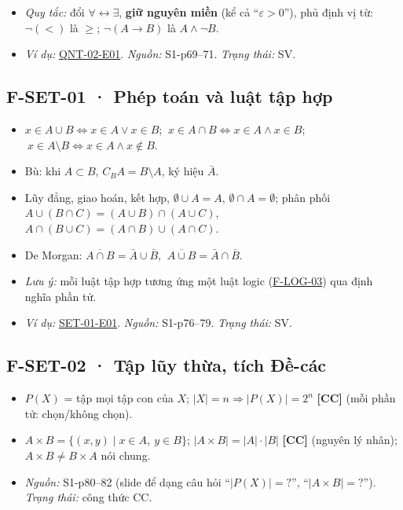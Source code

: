 \documentclass[
  10pt,
  twoside,openany]{book}
\providecommand{\tightlist}{%
  \setlength{\itemsep}{0pt}\setlength{\parskip}{0pt}}
\begin{document}
\begin{itemize}
\tightlist
\item
  \emph{Quy tắc:} đổi \(\forall\leftrightarrow\exists\), \textbf{giữ
  nguyên miền} (kể cả ``\(\varepsilon>0\)''), phủ định vị từ:
  \(\neg(<)\) là \(\ge\); \(\neg(A\to B)\) là \(A\wedge\neg B\).
\item
  \emph{Ví dụ:} \protect\hyperlink{QNT-02-E01}{QNT-02-E01}.
  \emph{Nguồn:} S1-p69--71. \emph{Trạng thái:} SV.
\end{itemize}

\hypertarget{F-SET-01}{%
\subsection{F-SET-01 · Phép toán và luật tập hợp}\label{F-SET-01}}

\begin{itemize}
\tightlist
\item
  \(x\in A\cup B\Leftrightarrow x\in A\vee x\in B\);
  \(\ x\in A\cap B\Leftrightarrow x\in A\wedge x\in B\);
  \(\ x\in A\setminus B\Leftrightarrow x\in A\wedge x\notin B\).
\item
  Bù: khi \(A\subset B\), \(C_BA=B\setminus A\), ký hiệu \(\bar A\).
\item
  Lũy đẳng, giao hoán, kết hợp, \(\emptyset\cup A=A\),
  \(\emptyset\cap A=\emptyset\); phân phối
  \(A\cup(B\cap C)=(A\cup B)\cap(A\cup C)\),
  \(A\cap(B\cup C)=(A\cap B)\cup(A\cap C)\).
\item
  De Morgan: \(\overline{A\cap B}=\bar A\cup\bar B\),
  \(\ \overline{A\cup B}=\bar A\cap\bar B\).
\item
  \emph{Lưu ý:} mỗi luật tập hợp tương ứng một luật logic
  (\protect\hyperlink{F-LOG-03}{F-LOG-03}) qua định nghĩa phần tử.
\item
  \emph{Ví dụ:} \protect\hyperlink{SET-01-E01}{SET-01-E01}.
  \emph{Nguồn:} S1-p76--79. \emph{Trạng thái:} SV.
\end{itemize}

\hypertarget{F-SET-02}{%
\subsection{F-SET-02 · Tập lũy thừa, tích Đề-các}\label{F-SET-02}}

\begin{itemize}
\tightlist
\item
  \(P(X)\) = tập mọi tập con của \(X\); \(|X|=n\Rightarrow|P(X)|=2^n\)
  \textbf{{[}CC{]}} (mỗi phần tử: chọn/không chọn).
\item
  \(A\times B=\{(x,y)\mid x\in A,\ y\in B\}\);
  \(|A\times B|=|A|\cdot|B|\) \textbf{{[}CC{]}} (nguyên lý nhân);
  \(A\times B\ne B\times A\) nói chung.
\item
  \emph{Nguồn:} S1-p80--82 (slide để dạng câu hỏi ``\(|P(X)|=?\)'',
  ``\(|A\times B|=?\)''). \emph{Trạng thái:} công thức CC.
\end{itemize}
\end{document}

